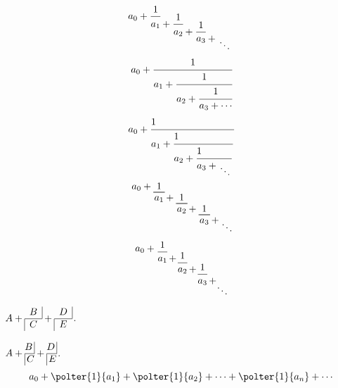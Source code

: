 \documentclass{article}
\begin{document}
	\newcommand*{\cofrac}[2]{%
		{%
			\rlap{$\dfrac{1}{\phantom{#1}}$}%
			\genfrac{}{}{0pt}{0}{}{#1+#2}%
		}%
	}
	\[
	a_0 +
	\cofrac{a_1}{
		\cofrac{a_2}{
			\cofrac{a_3}{
				\genfrac{}{}{0pt}{0}{}{\ddots}
	}}}
	\]
	\begin{equation*}
		a_0+\cfrac{1}{a_1+\cfrac{1}{a_2+\cfrac{1}{a_3+\cdots}}}
	\end{equation*}
	\def\cof#1{\displaystyle{1\strut\hfill\over #1}}
	$$ a_0 + \cof{a_1 + \cof{a_2 + \cof{a_3 + {\atop\ddots}}}} $$
	\newcommand*{\underBracket}[2][1]{\underbracket[.6pt][0pt]{~#1\vphantom{g}~}_{\displaystyle #2\vphantom{g+1}}}
	\begin{equation}
		a_0 + \underBracket{a_1\mathrlap{{}+ \underBracket{a_2\mathrlap{{} + \underBracket{a_3\mathrlap{{}+{}\raise-2.2ex\hbox{$\smash\ddots$}}}}}}}
		\hphantom{a_1 + a_2 + a_3 + {}} %
	\end{equation}
	\[
		a_0+
		\raisebox{-.25\height}{$\dfrac{1}{a_1\mathrlap{\,+}}$}\mkern15mu
		\raisebox{-1.1\height}{$\dfrac{1}{a_2\mathrlap{\,+}}$}\mkern15mu
		\raisebox{-2.0\height}{$\dfrac{1}{a_3\mathrlap{\,+}}$}\mkern15mu
		\raisebox{-3\height}{$\ddots$}
	\]
	\def\cFrac#1#2{%
		\begin{array}{@{}c@{}}\multicolumn{1}{c|}{#1}\\%
			\hline\multicolumn{1}{|c}{#2}\end{array}}
	
	\def\cFracB#1#2{%
		\vcenter{\hbox{\strut$#1$\,\vrule}\hrule\hbox{\strut\vrule\,$#2$}}}
	
	$ A + \cFrac{B}{C} + \cFrac{D}{E}$.
	
	$ A + \cFracB{B}{C} + \cFracB{D}{E}$.
	\[
	a_0+\polter{1}{a_1}+\polter{1}{a_2}+\cdots+\polter{1}{a_n}+\cdots
	\]
\end{document}
